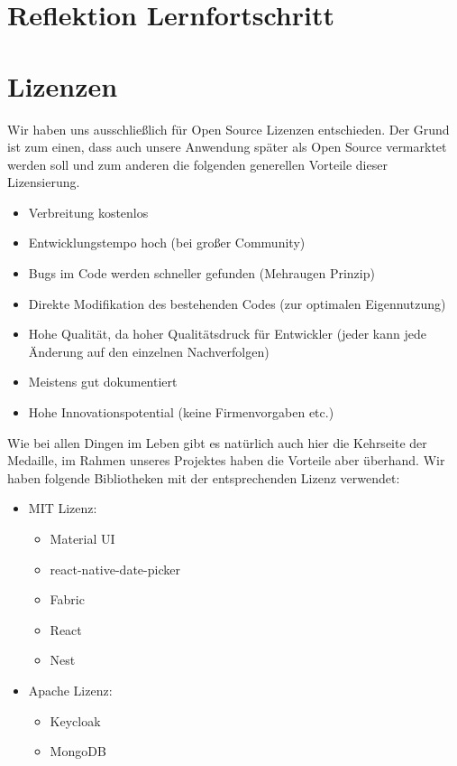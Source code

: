 \section{Reflektion Lernfortschritt}

\section{Lizenzen}
Wir haben uns ausschließlich für Open Source Lizenzen entschieden. 
Der Grund ist zum einen, dass auch unsere Anwendung später als Open Source vermarktet werden soll und zum anderen die folgenden generellen Vorteile dieser Lizensierung.

\begin{itemize}
    \item	Verbreitung kostenlos
    \item   Entwicklungstempo hoch (bei großer Community)
    \item   Bugs im Code werden schneller gefunden (Mehraugen Prinzip)
    \item	Direkte Modifikation des bestehenden Codes (zur optimalen Eigennutzung)
    \item	Hohe Qualität, da hoher Qualitätsdruck für Entwickler (jeder kann jede Änderung auf den einzelnen Nachverfolgen)
    \item	Meistens gut dokumentiert
    \item	Hohe Innovationspotential (keine Firmenvorgaben etc.)
\end{itemize}

Wie bei allen Dingen im Leben gibt es natürlich auch hier die Kehrseite der Medaille, im Rahmen unseres Projektes haben die Vorteile aber überhand. 
Wir haben folgende Bibliotheken mit der entsprechenden Lizenz verwendet:

\begin{itemize}
\item	MIT Lizenz:
\begin{itemize}
    \item	Material UI
    \item	react-native-date-picker
    \item	Fabric
    \item	React
    \item	Nest
\end{itemize}
\end{itemize}
\begin{itemize}
    \item	Apache Lizenz:
    \begin{itemize}
\item	Keycloak
\item	MongoDB
\end{itemize}
\end{itemize}


